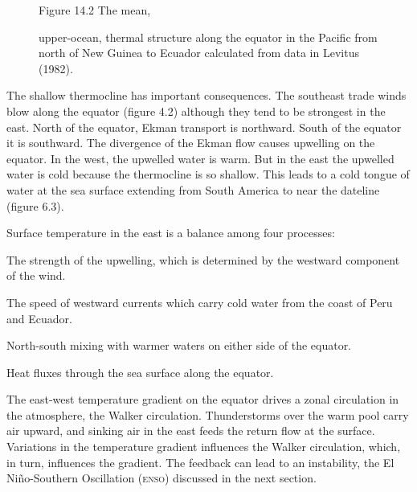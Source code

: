 \begin{figure}[t!]
\centering
{}
\footnotesize
Figure 14.2 The mean, \rule{0pt}{3ex}upper-ocean, thermal structure
along the equator in the Pacific from north of New Guinea to Ecuador
calculated from data in Levitus (1982).

\label{fig:equator}
\vspace{-2ex}
\end{figure}

The shallow thermocline has important
consequences. The southeast trade winds blow along the equator (figure
4.2) although they tend to be strongest in the east. North of the
equator, Ekman transport is northward. South of the
equator it is southward. The divergence of the Ekman flow causes
upwelling on the equator. In the west, the
upwelled water is warm. But in the east the upwelled water is cold
because the thermocline is so shallow.  This leads to a cold tongue of
water at the sea surface extending from South America to near the
dateline (figure 6.3).

Surface temperature in the east is a balance
among four processes:
\begin{enumerate}
\vitem The strength of the upwelling,
which is determined by the westward component of the wind.

\vitem The speed of westward currents which carry cold water from the
coast of Peru and Ecuador.

\vitem North-south mixing with warmer waters
on either side of the equator.

\vitem Heat fluxes through the sea surface along the equator.
\end{enumerate}

The east-west temperature gradient on the equator drives a zonal
circulation in the atmosphere, the Walker circulation. Thunderstorms
over the warm pool carry air upward, and sinking air in the east feeds
the return flow at the surface. Variations in the temperature gradient
influences the Walker circulation, which, in turn, influences the
gradient. The feedback can lead to an instability, the El
Ni\~{n}o-Southern Oscillation (\textsc{enso}) discussed in the next section.

